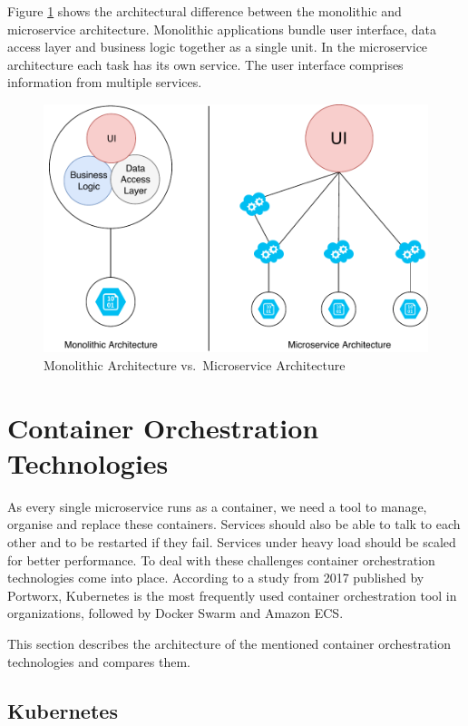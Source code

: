 Figure \ref{monolithic_vs_microservice} shows the architectural
difference between the monolithic and microservice architecture.
Monolithic applications bundle user interface, data access layer and
business logic together as a single unit. In the microservice
architecture each task has its own service. The user interface comprises
information from multiple services.

\begin{figure}
\centering
\includegraphics[width=15.00000cm]{images/monolithic_vs_microservice}
\caption{Monolithic Architecture vs.~Microservice Architecture
\label{monolithic_vs_microservice}}
\end{figure}

\section{Container Orchestration
Technologies}\label{container-orchestration-technologies}

As every single microservice runs as a container, we need a tool to
manage, organise and replace these containers. Services should also be
able to talk to each other and to be restarted if they fail. Services
under heavy load should be scaled for better performance. To deal with
these challenges container orchestration technologies come into place.
According to a study from 2017 published by Portworx, Kubernetes is the
most frequently used container orchestration tool in organizations,
followed by Docker Swarm and Amazon ECS. \cite{portworx-2017}

This section describes the architecture of the mentioned container
orchestration technologies and compares them.

\subsection{Kubernetes}\label{kubernetes}

